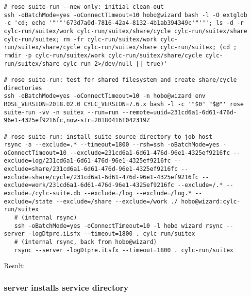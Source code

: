 \vspace{5mm}
\begin{lstlisting}
# rose suite-run --new only: initial clean-out
ssh -oBatchMode=yes -oConnectTimeout=10 hobo@wizard bash -l -O extglob -c 'cd; echo '"'"'673d7a0d-7816-42a4-8132-4b1ab394349c'"'"'; ls -d -r cylc-run/suitex/work cylc-run/suitex/share/cycle cylc-run/suitex/share cylc-run/suitex; rm -fr cylc-run/suitex/work cylc-run/suitex/share/cycle cylc-run/suitex/share cylc-run/suitex; (cd ; rmdir -p cylc-run/suitex/work cylc-run/suitex/share/cycle cylc-run/suitex/share cylc-run 2>/dev/null || true)'

# rose suite-run: test for shared filesystem and create share/cycle directories
ssh -oBatchMode=yes -oConnectTimeout=10 -n hobo@wizard env ROSE_VERSION=2018.02.0 CYLC_VERSION=7.6.x bash -l -c '"$0" "$@"' rose suite-run -vv -n suitex --run=run --remote=uuid=231cd6a1-6d61-476d-96e1-4325ef9216fc,now-str=20180416T042319Z

# rose suite-run: install suite source directory to job host
rsync -a --exclude=.* --timeout=1800 --rsh=ssh -oBatchMode=yes -oConnectTimeout=10 --exclude=231cd6a1-6d61-476d-96e1-4325ef9216fc --exclude=log/231cd6a1-6d61-476d-96e1-4325ef9216fc --exclude=share/231cd6a1-6d61-476d-96e1-4325ef9216fc --exclude=share/cycle/231cd6a1-6d61-476d-96e1-4325ef9216fc --exclude=work/231cd6a1-6d61-476d-96e1-4325ef9216fc --exclude=/.* --exclude=/cylc-suite.db --exclude=/log --exclude=/log.* --exclude=/state --exclude=/share --exclude=/work ./ hobo@wizard:cylc-run/suitex
   # (internal rsync)
   ssh -oBatchMode=yes -oConnectTimeout=10 -l hobo wizard rsync --server -logDtpre.iLsfx --timeout=1800 . cylc-run/suitex
   # (internal rsync, back from hobo@wizard)
   rsync --server -logDtpre.iLsfx --timeout=1800 . cylc-run/suitex
\end{lstlisting}

\vspace{5mm}
Result:
\lstset{language=sh}
{\scriptsize
{}
}

\subsubsection{server installs service directory}

